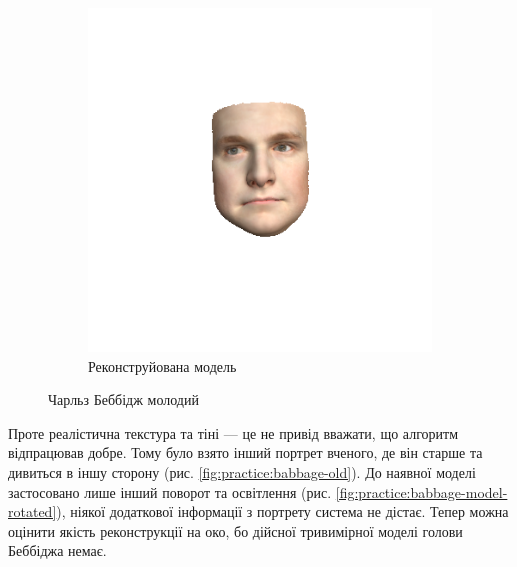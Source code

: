 \begin{figure}[h]
\begin{subfigure}[b]{0.4\textwidth}
    \includegraphics[width=\textwidth]{images/babbage-model}
    \caption{Реконструйована модель}
    \label{fig:practice:babbage-model}
  \end{subfigure}
  \caption{Чарльз Беббідж молодий}
\end{figure}

Проте реалістична текстура та тіні --- це не привід вважати,
що алгоритм відпрацював добре.
Тому було взято інший портрет вченого,
де він старше та дивиться в іншу сторону
(рис. \ref{fig:practice:babbage-old}).
До наявної моделі застосовано лише інший поворот та освітлення
(рис. \ref{fig:practice:babbage-model-rotated}),
ніякої додаткової інформації з портрету система не дістає.
Тепер можна оцінити якість реконструкції на око,
бо дійсної тривимірної моделі голови Беббіджа немає.

